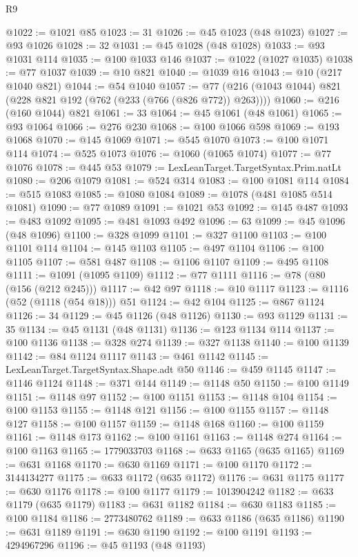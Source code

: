 \begin{lexlean}{R9}
\begin{coremodule}
{{{{{{{{{{{{{{{{{{{{{{{{{{{{{{{{{{{{{{{{{{{{{{{{{{{{{{{{{{{{{{{{{{{{{{{{{{{{{{{{{{{{{{{{{{{{{{{{{{{{{{{{{{{{@1022 := @1021 @85
@1023 := 31
@1026 := @45 @1023 (@48 @1023)
@1027 := @93 @1026
@1028 := 32
@1031 := @45 @1028 (@48 @1028)
@1033 := @93 @1031 @114
@1035 := @100 @1033 @146
@1037 := @1022 (@1027 @1035)
@1038 := @77 @1037
@1039 := @10 @821
@1040 := @1039 @16
@1043 := @10 (@217 @1040 @821)
@1044 := @54 @1040
@1057 := @77 (@216 (@1043 @1044) @821 (@228 @821 @192 (@762 (@233 (@766 (@826 @772)) @263))))
@1060 := @216 (@160 @1044) @821
@1061 := 33
@1064 := @45 @1061 (@48 @1061)
@1065 := @93 @1064
@1066 := @276 @230
@1068 := @100 @1066 @598
@1069 := @193 @1068
@1070 := @145 @1069
@1071 := @545 @1070
@1073 := @100 @1071 @114
@1074 := @525 @1073
@1076 := @1060 (@1065 @1074)
@1077 := @77 @1076
@1078 := @445 @53
@1079 := LexLeanTarget.TargetSyntax.Prim.natLt
@1080 := @206 @1079
@1081 := @524 @314
@1083 := @100 @1081 @114
@1084 := @515 @1083
@1085 := @1080 @1084
@1089 := @1078 (@481 @1085 @514 @1081)
@1090 := @77 @1089
@1091 := @1021 @53
@1092 := @145 @487
@1093 := @483 @1092
@1095 := @481 @1093 @492
@1096 := 63
@1099 := @45 @1096 (@48 @1096)
@1100 := @328 @1099
@1101 := @327 @1100
@1103 := @100 @1101 @114
@1104 := @145 @1103
@1105 := @497 @1104
@1106 := @100 @1105
@1107 := @581 @487
@1108 := @1106 @1107
@1109 := @495 @1108
@1111 := @1091 (@1095 @1109)
@1112 := @77 @1111
@1116 := @78 (@80 (@156 (@212 @245)))
@1117 := @42 @97
@1118 := @10 @1117
@1123 := @1116 (@52 (@1118 (@54 @18))) @51
@1124 := @42 @104
@1125 := @867 @1124
@1126 := 34
@1129 := @45 @1126 (@48 @1126)
@1130 := @93 @1129
@1131 := 35
@1134 := @45 @1131 (@48 @1131)
@1136 := @123 @1134 @114
@1137 := @100 @1136
@1138 := @328 @274
@1139 := @327 @1138
@1140 := @100 @1139
@1142 := @84 @1124 @1117
@1143 := @461 @1142
@1145 := LexLeanTarget.TargetSyntax.Shape.adt @50
@1146 := @459 @1145
@1147 := @1146 @1124
@1148 := @371 @144
@1149 := @1148 @50
@1150 := @100 @1149
@1151 := @1148 @97
@1152 := @100 @1151
@1153 := @1148 @104
@1154 := @100 @1153
@1155 := @1148 @121
@1156 := @100 @1155
@1157 := @1148 @127
@1158 := @100 @1157
@1159 := @1148 @168
@1160 := @100 @1159
@1161 := @1148 @173
@1162 := @100 @1161
@1163 := @1148 @274
@1164 := @100 @1163
@1165 := 1779033703
@1168 := @633 @1165 (@635 @1165)
@1169 := @631 @1168
@1170 := @630 @1169
@1171 := @100 @1170
@1172 := 3144134277
@1175 := @633 @1172 (@635 @1172)
@1176 := @631 @1175
@1177 := @630 @1176
@1178 := @100 @1177
@1179 := 1013904242
@1182 := @633 @1179 (@635 @1179)
@1183 := @631 @1182
@1184 := @630 @1183
@1185 := @100 @1184
@1186 := 2773480762
@1189 := @633 @1186 (@635 @1186)
@1190 := @631 @1189
@1191 := @630 @1190
@1192 := @100 @1191
@1193 := 4294967296
@1196 := @45 @1193 (@48 @1193)
}}}}}}}}}}}}}}}}}}}}}}}}}}}}}}}}}}}}}}}}}}}}}}}}}}}}}}}}}}}}}}}}}}}}}}}}}}}}}}}}}}}}}}}}}}}}}}}}}}}}}}}}}}}}
\end{coremodule}
\end{lexlean}
